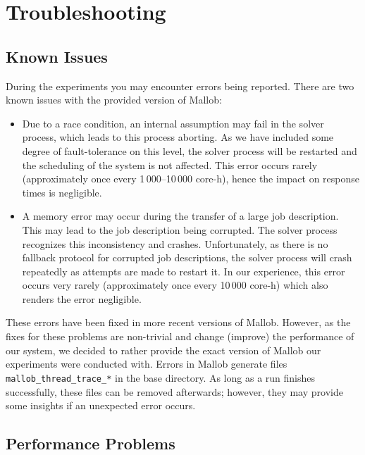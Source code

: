 \documentclass[runningheads]{article}
\numberwithin{dummy}{subsection}
\begin{document}
\section{Troubleshooting}

\subsection{Known Issues}

During the experiments you may encounter errors being reported.
There are two known issues with the provided version of Mallob:
\begin{itemize}
 \item Due to a race condition, an internal assumption may fail in the solver process, which leads to this process aborting. As we have included some degree of fault-tolerance on this level, the solver process will be restarted and the scheduling of the system is not affected. This error occurs rarely (approximately once every 1\,000--10\,000 core-h), hence the impact on response times is negligible.
 \item A memory error may occur during the transfer of a large job description. This may lead to the job description being corrupted. The solver process recognizes this inconsistency and crashes. Unfortunately, as there is no fallback protocol for corrupted job descriptions, the solver process will crash repeatedly as attempts are made to restart it.
 In our experience, this error occurs very rarely (approximately once every 10\,000 core-h) which also renders the error negligible.
\end{itemize}
These errors have been fixed in more recent versions of Mallob.
However, as the fixes for these problems are non-trivial and change (improve) the performance of our system, we decided to rather provide the exact version of Mallob our experiments were conducted with.
Errors in Mallob generate files \texttt{mallob\_thread\_trace\_*} in the base directory.
As long as a run finishes successfully, these files can be removed afterwards; however, they may provide some insights if an unexpected error occurs.

\subsection{Performance Problems}
\end{document}
